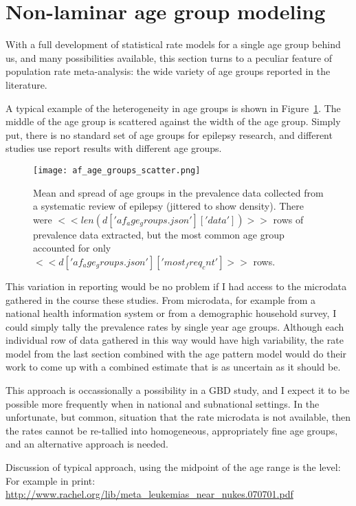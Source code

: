 \section{Non-laminar age group modeling}
With a full development of statistical rate models for a single age
group behind us, and many possibilities available, this section turns
to a peculiar feature of population rate meta-analysis: the wide
variety of age groups reported in the literature.

A typical example of the heterogeneity in age groups is shown in
Figure~\ref{theory-age_group_model-af_age_groups}.  The middle of the
age group is scattered against the width of the age group.  Simply
put, there is no standard set of age groups for epilepsy research, and
different studies use report results with different age groups.

\begin{figure}[h]
\begin{center}
\texttt{[image: af\_age\_groups\_scatter.png]}
\end{center}
\caption{Mean and spread of age groups in the prevalence data collected
  from a systematic review of epilepsy (jittered to show density).
  There were $<<len(d['af_age_groups.json']['data'])>>$ rows of prevalence
  data extracted, but the most common age
  group accounted for only $<<d['af_age_groups.json']['most_freq_cnt']>>$ rows.}
\label{theory-age_group_model-af_age_groups}
\end{figure}

This variation in reporting would be no problem if I had access to the
microdata gathered in the course these studies.  From microdata, for
example from a national health information system or from a
demographic household survey, I could simply tally the prevalence
rates by single year age groups.  Although each individual row of data
gathered in this way would have high variability, the rate model from
the last section combined with the age pattern model would do their
work to come up with a combined estimate that is as uncertain as it
should be.

This approach is occassionally a possibility in a GBD study, and I
expect it to be possible more frequently when in national and
subnational settings.  In the unfortunate, but common, situation that
the rate microdata is not available, then the rates cannot be
re-tallied into homogeneous, appropriately fine age groups, and an
alternative approach is needed.

Discussion of typical approach, using the midpoint of the age range is
the level:
For example in print: \url{
  http://www.rachel.org/lib/meta_leukemias_near_nukes.070701.pdf }

